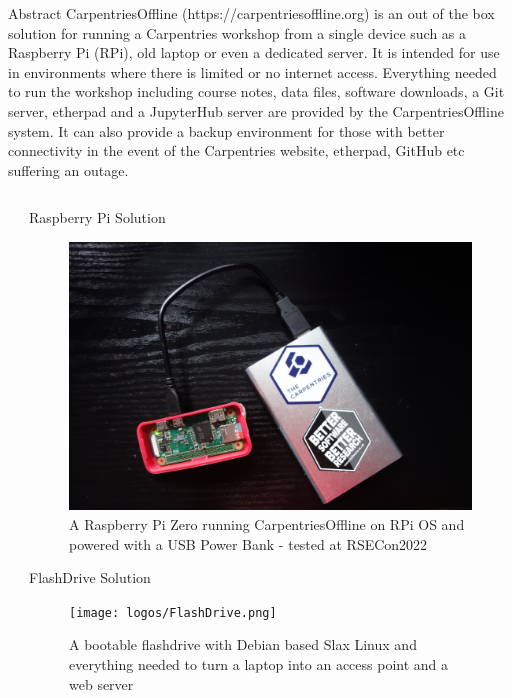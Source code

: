 \documentclass[final,20pt]{beamer}
\newlength{\sepwidth}
\newlength{\colwidth}
\newcommand{\separatorcolumn}{\begin{column}{\sepwidth}\end{column}}
\begin{document}
	\begin{frame}[t]
		\begin{block}{\large Abstract}	
			CarpentriesOffline (https://carpentriesoffline.org) is an out of the box solution for running a Carpentries workshop from a single device such as a Raspberry Pi (RPi), old laptop or even a dedicated server. It is intended for use in environments where there is limited or no internet access. Everything needed to run the workshop including course notes, data files, software downloads, a Git server, etherpad and a JupyterHub server are provided by the CarpentriesOffline system. It can also provide a backup environment for those with better connectivity in the event of the Carpentries website, etherpad, GitHub etc suffering an outage.
		\end{block}
		\vfill
		\begin{columns}[t]
			\separatorcolumn
			\begin{column}{\colwidth}
				\begin{block}{Raspberry Pi Solution}
					\begin{center}
						\begin{figure}
							\includegraphics[width=0.6\columnwidth]{logos/CarpentriesOfflinePhoto.png}
							\caption{A Raspberry Pi Zero running CarpentriesOffline on RPi OS and powered with a USB Power Bank - tested at RSECon2022}
						\end{figure}
					\end{center}
				\end{block}
				\begin{block}{FlashDrive Solution}
					\begin{figure}
						\begin{center}
							\texttt{[image: logos/FlashDrive.png]}
							\caption{A bootable flashdrive with Debian based Slax Linux and everything needed to turn a laptop into an access point and a web server}
						\end{center}
					\end{figure}


\end{block}
\end{column}
\end{columns}
\end{frame}
\end{document}
